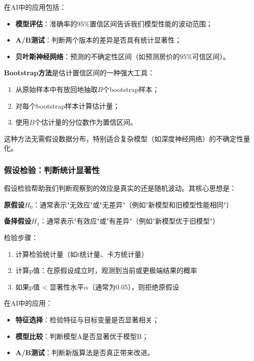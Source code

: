 在AI中的应用包括：
\begin{itemize}
  \item \textbf{模型评估}：准确率的95\%置信区间告诉我们模型性能的波动范围；
  \item \textbf{A/B测试}：判断两个版本的差异是否具有统计显著性；
  \item \textbf{贝叶斯神经网络}：预测的不确定性区间（如预测房价的95\%可信区间）。
\end{itemize}

\textbf{Bootstrap方法}是估计置信区间的一种强大工具：
\begin{enumerate}
  \item 从原始样本中有放回地抽取$B$个bootstrap样本；
  \item 对每个bootstrap样本计算估计量；
  \item 使用$B$个估计量的分位数作为置信区间。
\end{enumerate}

这种方法无需假设数据分布，特别适合复杂模型（如深度神经网络）的不确定性量化。

\subsubsection{假设检验：判断统计显著性}

假设检验帮助我们判断观察到的效应是真实的还是随机波动。其核心思想是：

\textbf{原假设}$H_0$：通常表示"无效应"或"无差异"（例如"新模型和旧模型性能相同"）

\textbf{备择假设}$H_1$：通常表示"有效应"或"有差异"（例如"新模型优于旧模型"）

检验步骤：
\begin{enumerate}
  \item 计算检验统计量（如t统计量、卡方统计量）
  \item 计算p值：在原假设成立时，观测到当前或更极端结果的概率
  \item 如果p值 < 显著性水平$\alpha$（通常为0.05），则拒绝原假设
\end{enumerate}

在AI中的应用：
\begin{itemize}
  \item \textbf{特征选择}：检验特征与目标变量是否显著相关；
  \item \textbf{模型比较}：判断模型A是否显著优于模型B；
  \item \textbf{A/B测试}：判断新版算法是否真正带来改进。
\end{itemize}


